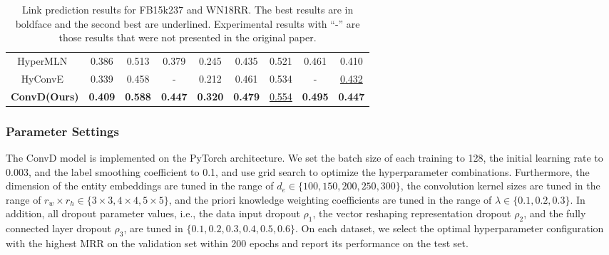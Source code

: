 \documentclass[letterpaper]{article} %
\begin{document}
\begin{table}[h]
{\begin{tabular}{c|cccc|cccc}
        HyperMLN~\cite{HyperMLN} & 0.386 & 0.513 & 0.379 & 0.245 & 0.435 & 0.521 & 0.461 & 0.410 \\
        HyConvE~\cite{HyConvE} & 0.339 & 0.458 & - & 0.212 & 0.461 & 0.534 & - & \underline{0.432} \\
        \hline
        \textbf{ConvD(Ours)} & \textbf{0.409} & \textbf{0.588} & \textbf{0.447} & \textbf{0.320} & \textbf{0.479} & \underline{0.554} & \textbf{0.495} & \textbf{0.447} \\
        \hline
    \end{tabular}
  }
  \caption{Link prediction results for FB15k237 and WN18RR. The best results are in boldface and the second best are underlined. Experimental results with ``-'' are those results that were not presented in the original paper.}
  \label{table:FB15B237-WN18RR}
\end{table}


\subsubsection{Parameter Settings}
The ConvD model is implemented on the PyTorch architecture. We set the batch size of each training to 128, the initial learning rate to 0.003, and the label smoothing coefficient to 0.1, and use grid search to optimize the hyperparameter combinations. Furthermore, the dimension of the entity embeddings are tuned in the range of $d_{e} \in \{100, 150, 200, 250, 300\}$, the convolution kernel sizes are tuned in the range of $r_{w} \times r_{h} \in \{3 \times 3, 4 \times 4, 5 \times 5\}$, and the priori knowledge weighting coefficients are tuned in the range of $\lambda \in \{0.1, 0.2, 0.3\}$. In addition, all dropout parameter values, i.e., the data input dropout $\rho_{1}$, the vector reshaping representation dropout $\rho_{2}$, and the fully connected layer dropout $\rho_{3}$, are tuned in $\{0.1, 0.2, 0.3, 0.4, 0.5, 0.6\}$. On each dataset, we select the optimal hyperparameter configuration with the highest MRR on the validation set within 200 epochs and report its performance on the test set.
\end{document}
